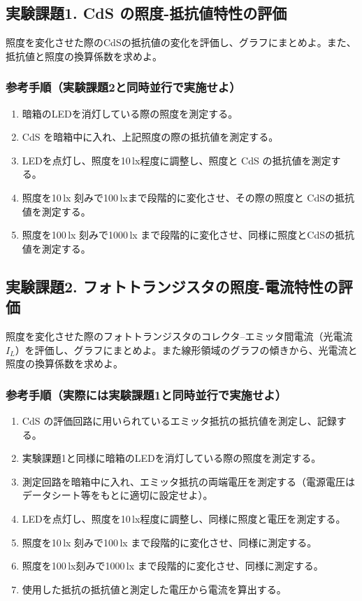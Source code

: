 \documentclass[11pt,a4paper]{jsarticle}
\begin{document}
\subsection*{実験課題1. CdS の照度-抵抗値特性の評価}
照度を変化させた際のCdSの抵抗値の変化を評価し、グラフにまとめよ。また、抵抗値と照度の換算係数を求めよ。

\subsubsection*{参考手順（実験課題2と同時並行で実施せよ）}
\begin{enumerate}
    \item 暗箱のLEDを消灯している際の照度を測定する。
    \item CdS を暗箱中に入れ、上記照度の際の抵抗値を測定する。
    \item LEDを点灯し、照度を10\,lx程度に調整し、照度と CdS の抵抗値を測定する。
    \item 照度を10\,lx 刻みで100\,lxまで段階的に変化させ、その際の照度と CdSの抵抗値を測定する。
    \item 照度を100\,lx 刻みで1000\,lx まで段階的に変化させ、同様に照度とCdSの抵抗値を測定する。
\end{enumerate}

\subsection*{実験課題2. フォトトランジスタの照度-電流特性の評価}
照度を変化させた際のフォトトランジスタのコレクタ--エミッタ間電流（光電流$I_L$）を評価し、グラフにまとめよ。また線形領域のグラフの傾きから、光電流と照度の換算係数を求めよ。
\subsubsection*{参考手順（実際には実験課題1と同時並行で実施せよ）}
\begin{enumerate}
    \item CdS の評価回路に用いられているエミッタ抵抗の抵抗値を測定し、記録する。
    \item 実験課題1と同様に暗箱のLEDを消灯している際の照度を測定する。
    \item 測定回路を暗箱中に入れ、エミッタ抵抗の両端電圧を測定する（電源電圧はデータシート等をもとに適切に設定せよ）。
    \item LEDを点灯し、照度を10\,lx程度に調整し、同様に照度と電圧を測定する。
    \item 照度を10\,lx 刻みで100\,lx まで段階的に変化させ、同様に測定する。
    \item 照度を100\,lx刻みで1000\,lx まで段階的に変化させ、同様に測定する。
    \item 使用した抵抗の抵抗値と測定した電圧から電流を算出する。
\end{enumerate}
\end{document}
